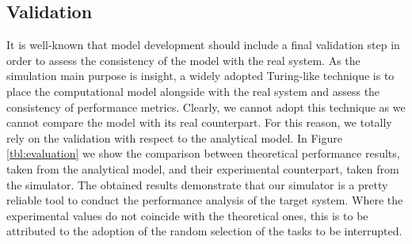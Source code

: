 \subsection{Validation}
It is well-known that model development should include a final validation step in order to assess the consistency of the model with the real system. 
%
As the simulation main purpose is insight, a widely adopted Turing-like technique is to place the computational model alongside with the real system and assess the consistency of performance metrics.
%
Clearly, we cannot adopt this technique as we cannot compare the model with its real counterpart.
%
For this reason, we totally rely on the validation with respect to the analytical model. 
In Figure \ref{tbl:evaluation} we show the comparison between theoretical performance results, taken from the analytical model, and their experimental counterpart, taken from the simulator. 
The obtained results demonstrate that our simulator is a pretty reliable tool to conduct the performance analysis of the target system. Where the experimental values do not coincide with the theoretical ones, this is to be attributed to the adoption of the random selection of the tasks to be interrupted.